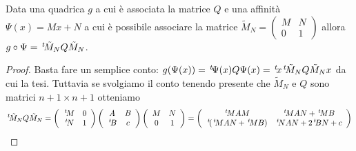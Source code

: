 \documentclass[a4paper,12pt]{article}
\begin{document}
\begin{lemma}
	Data una quadrica $g$ a cui è associata la matrice $Q$ e una affinità $\Psi(x)=Mx+N$ a cui è possibile  associare la matrice
	$\tilde M_N = \left(\begin{smallmatrix}
M & N \\ 0 & 1
\end{smallmatrix}
\right)$ allora 
	$g\circ \Psi = \, ^{t}\!\tilde M_NQ \tilde M_N$.
\end{lemma}
\begin{proof}
	Basta fare un semplice conto: $g(\Psi(x))=\, ^{t}\!\Psi(x)Q \Psi(x) = \, ^{t}\!x\, ^{t}\!\tilde M_NQ \tilde M_N x$ da cui la tesi.
	Tuttavia se svolgiamo il conto tenendo presente che  $\tilde M_N$ e $Q$ sono matrici $n+1\times n+1$ otteniamo
	\[
		\tra{\tilde M_N}Q \tilde M_N = 
		\left(
			\begin{array}{cc}
			\tra{M} & 0\\
			\tra{N} & 1
			\end{array}
		\right)
		\left(
			\begin{array}{cc}
			A & B\\
			\tra{B} & c
			\end{array}
		\right)
		\left(
			\begin{array}{cc}
			M & N\\
			0 & 1
			\end{array}
		\right) =
		\left(
			\begin{array}{cc}
			\tra{M}AM & \tra{M}AN+\tra{M}B\\
			\tra{(\tra{M}AN+\tra{M}B)}& \tra{N}AN+2\tra{B}N+c
			\end{array}
		\right)
	\]

\end{proof}
\end{document}
